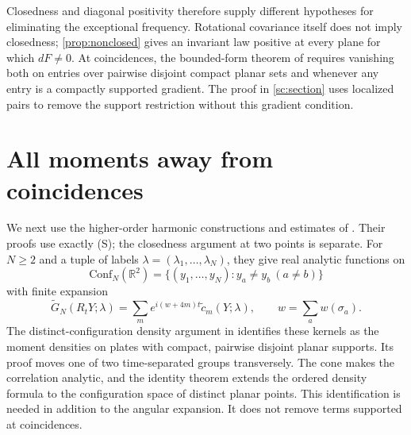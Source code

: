 \documentclass[11pt,letterpaper,reqno]{amsart}
\theoremstyle{definition}
\theoremstyle{remark}
\newcommand{\R}{\mathbb R}\newcommand{\C}{\mathbb C}
\begin{document}
Closedness and diagonal positivity therefore supply different
hypotheses for eliminating the exceptional frequency. Rotational
covariance itself does not imply closedness; \cref{prop:nonclosed}
gives an invariant law positive at every plane for which $dF\ne0$.
At coincidences, the bounded-form theorem of
\cite[Theorem~A]{Coincidences}
requires vanishing both on entries over pairwise disjoint compact
planar sets and whenever any entry is a compactly supported gradient.
The proof in \cref{sc:section} uses localized pairs to remove the
support restriction without this gradient condition.

\section{All moments away from coincidences}\label{sec:harmonics}

We next use the higher-order harmonic constructions and estimates of
\cite[Sections~8.7--8.9]{QEDCurrent}. Their proofs use exactly (S);
the closedness argument at two points is separate. For $N\ge2$ and a tuple of
labels $\lambda=(\lambda_1,\ldots,\lambda_N)$, they give real analytic
functions on
\[
 \mathrm{Conf}_N(\R^2)=\{(y_1,\ldots,y_N):y_a\ne y_b\ (a\ne b)\}
\]
with finite expansion
\begin{equation}\label{eq:all-harmonics}
 \widetilde G_N(R_tY;\lambda)
 =\sum_m e^{i(w+4m)t}\widetilde c_m(Y;\lambda),
 \qquad w=\sum_aw(\sigma_a).
\end{equation}
The distinct-configuration density argument in
\cite[Section~8.10]{QEDCurrent} identifies these
kernels as the moment densities on plates with compact, pairwise
disjoint planar supports. Its proof moves one of two time-separated
groups transversely. The cone makes the correlation analytic, and
the identity theorem extends the ordered density formula to the
configuration space of distinct planar points. This identification
is needed in addition to the angular expansion. It does not remove
terms supported at coincidences.
\end{document}
